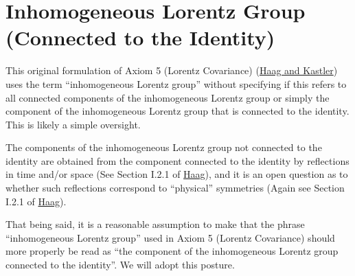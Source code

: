 \section{Inhomogeneous Lorentz Group (Connected to the Identity)}\label{sctn:inhomogeneous-lorentz-group-(connected-to-the-identity)}
This original formulation of Axiom 5 (Lorentz Covariance) (\href{https://doi.org/10.1063/1.1704187}{Haag and Kastler}) uses the term ``inhomogeneous Lorentz group'' without specifying if this refers to all connected components of the inhomogeneous Lorentz group or simply the component of the inhomogeneous Lorentz group that is connected to the identity. This is likely a simple oversight.

The components of the inhomogeneous Lorentz group not connected to the identity are obtained from the component connected to the identity by reflections in time and/or space (See Section I.2.1 of  \href{https://doi.org/10.1007/978-3-642-61458-3}{Haag}), and it is an open question as to whether such reflections correspond to ``physical'' symmetries (Again see Section I.2.1 of  \href{https://doi.org/10.1007/978-3-642-61458-3}{Haag}).

That being said, it is a reasonable assumption to make that the phrase ``inhomogeneous Lorentz group'' used in Axiom 5 (Lorentz Covariance) should more properly be read as ``the component of the inhomogeneous Lorentz group connected to the identity''. We will adopt this posture.
